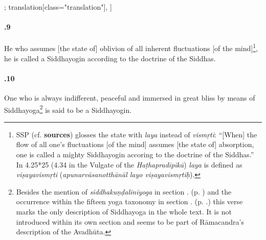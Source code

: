 \begin{alignment}[
  texts=edition[class="edition"];
  translation[class="translation"],
  ]
\begin{translation}
\begin{tlate}[44_9]
      \paragraph{.9} He who assumes [the state of] oblivion of all inherent fluctuations [of the mind]\footnote{SSP (cf. \textbf{sources}) glosses the state with \textit{laya} instead of \textit{vismṛti}: ``[When] the flow of all one's fluctuations [of the mind] assumes [the state of] absorption, one is called a mighty Siddhayogin accoring to the doctrine of the Siddhas.'' In  4.25*25 (4.34 in the Vulgate of the \textit{Haṭhapradīpikā}) \textit{laya} is defined as \textit{viṣayavismṛti} (\textit{apunarvāsanotthānāl layo viṣayavismṛtiḥ}).}, he is called a Siddhayogin according to the doctrine of the Siddhas.
    \end{tlate}
    \begin{tlate}[44_10]
      \paragraph{.10} One who is always indifferent, peaceful and immersed in great bliss by means of Siddhayoga\footnote{Besides the mention of \textit{siddhakuṇḍalinīyoga} in section . (p. \pageref{siddhayoga}) and the occurrence within the fifteen yoga taxonomy in section . (p. \pageref{intro}.) this verse marks the only description of Siddhayoga in the whole text. It is not introduced within its own section and seems to be part of Rāmacandra's description of the Avadhūta.} is said to be a Siddhayogin.
      \flushpage
    \end{tlate}
  \end{translation}
\end{alignment}
\pagebreak %
